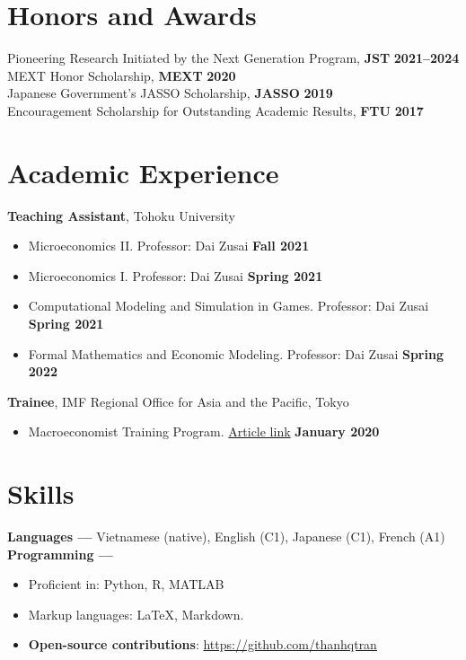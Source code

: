 \documentclass[margin,line]{res}
\begin{document}
\begin{resume}
\section{\sc Honors and Awards}
Pioneering Research Initiated by the Next Generation Program, {\bf JST} \hfill {\bf 2021--2024}\\
MEXT Honor Scholarship, {\bf MEXT} \hfill {\bf 2020}\\
Japanese Government's JASSO Scholarship, {\bf JASSO} \hfill {\bf 2019}\\
Encouragement Scholarship for Outstanding Academic Results, {\bf FTU} \hfill {\bf 2017}\\

\vspace{4mm}

\section{\sc Academic Experience}
{\bf Teaching Assistant}, Tohoku University
\begin{itemize}
\item[ ] Microeconomics II. Professor: Dai Zusai \hfill {\bf Fall 2021}
\item[ ] Microeconomics I. Professor: Dai Zusai \hfill {\bf Spring 2021}
\item[ ] Computational Modeling and Simulation in Games. Professor: Dai Zusai \hfill {\bf Spring 2021}
\item[ ] Formal Mathematics and Economic Modeling. Professor: Dai Zusai \hfill {\bf Spring 2022}
\end{itemize}
\vspace*{.05in}
{\bf Trainee}, IMF Regional Office for Asia and the Pacific, Tokyo
\vspace*{.05in}
\begin{itemize}
\item[ ] Macroeconomist Training Program. \href{https://www.imf.org/en/Countries/ResRep/OAP-Home/~/link.aspx?_id=C2F64E8412B64A86BD37DDEB8439312B&_z=z}{Article link} \hfill {\bf January 2020}
\end{itemize}

\vspace{4mm}

\section{\sc Skills}
{\bf Languages ---}
\vspace*{.05in}
Vietnamese (native), English (C1), Japanese (C1), French (A1)\\
{\bf Programming ---}
\vspace*{.05in}
\begin{itemize}
	\item Proficient in: Python, R, MATLAB
	\item Markup languages: \LaTeX, Markdown.
	\item {\bf Open-source contributions}: \url{https://github.com/thanhqtran}
\end{itemize}


\end{resume}
\end{document}
